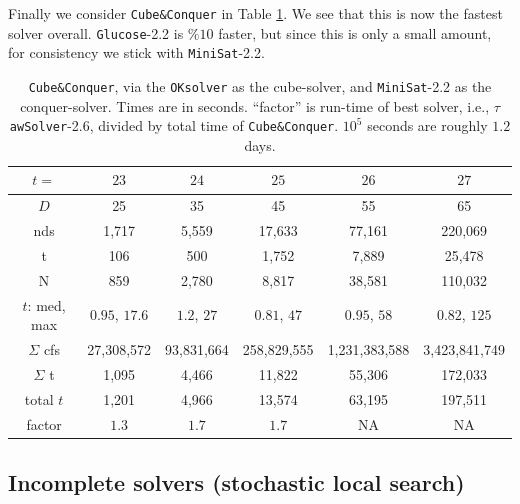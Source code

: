 \documentclass[final,3p,times]{elsarticle}
\theoremstyle{definition}
\newcommand{\ttawsolver}{$\tau$\texttt{awSolver}-2.6}
\newcommand{\oksolver}{\texttt{OKsolver}}
\newcommand{\minisat}{\texttt{MiniSat}}
\newcommand{\glucose}{\texttt{Glucose}}
\newcommand{\cubeconq}{\texttt{Cube\:\&\:Conquer}}
\begin{document}
Finally we consider \cubeconq{} in Table \ref{tab:CCpdvdW}. We see that this is now the fastest solver overall. \glucose-2.2 is $\%10$ faster, but since this is only a small amount, for consistency we stick with \minisat-2.2.

\begin{table}[H]
  \centering
  \begin{tabular}{c||c|c|c|c|c}
    $t=$ & $23$ & $24$ & $25$ & $26$ & $27$\\
    \hline\hline
    $D$ & 25 & 35 & 45 & 55 & 65\\
    nds & 1,717 & 5,559 & 17,633 & 77,161 & 220,069\\
    t & 106 & 500 & 1,752 & 7,889 & 25,478\\
    N & 859 & 2,780 & 8,817 & 38,581 & 110,032\\
    \hline
    $t$: med, max & $0.95$, $17.6$ & $1.2$, $27$ & $0.81$, $47$ & $0.95$, $58$ & $0.82$, $125$\\
    $\Sigma$ cfs & 27,308,572 & 93,831,664 & 258,829,555 & 1,231,383,588 & 3,423,841,749\\
    $\Sigma$ t & 1,095 & 4,466 & 11,822 & 55,306 & 172,033\\
    \hline
    total $t$ & 1,201 & 4,966 & 13,574 & 63,195 & 197,511\\
    \hline
    factor & $1.3$ & $1.7$ & $1.7$ & NA & NA
  \end{tabular}
  \caption{\cubeconq, via the \oksolver{} as the cube-solver, and \minisat-2.2 as the conquer-solver. Times are in seconds. ``factor'' is run-time of best solver, i.e., \ttawsolver, divided by total time of \cubeconq. $10^5$ seconds are roughly $1.2$ days.}
  \label{tab:CCpdvdW}
\end{table}





\subsection{Incomplete solvers (stochastic local search)}
\label{sec:remsatincomp}
\end{document}
